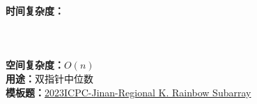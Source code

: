 \textbf{时间复杂度：}\\
\\
\\
\\
\textbf{空间复杂度：}$O(n)$\\
\textbf{用途：}双指针中位数\\
\textbf{模板题：}\href{https://qoj.ac/contest/1472/problem/7904}{2023ICPC-Jinan-Regional K. Rainbow Subarray}
